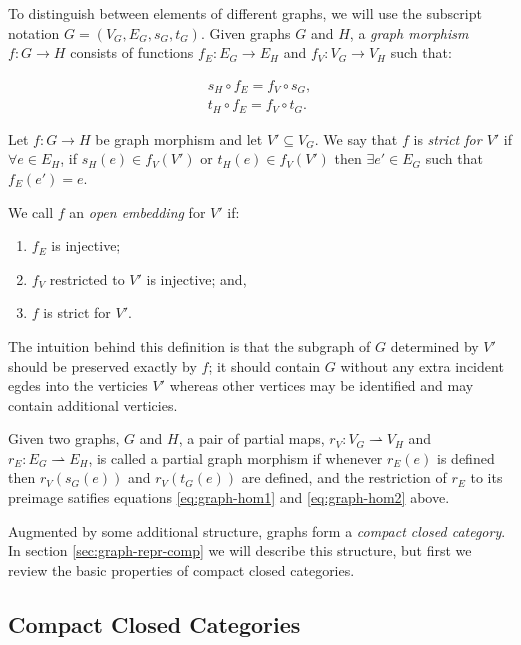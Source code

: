 \documentclass[runningheads]{llncs}
\begin{document}
To distinguish between elements of different graphs, we will use the
subscript notation $G = (V_G,E_G,s_G,t_G)$. Given graphs $G$ and $H$,
a \emph{graph morphism} $f : G\to H$ consists of functions $f_E : E_G
\to E_H$ and $f_V:V_G\to V_H$ such that:

\begin{gather}
  s_H\circ f_E = f_V \circ s_G,\label{eq:graph-hom1}\\
  t_H\circ f_E = f_V \circ t_G\label{eq:graph-hom2}.
\end{gather}

Let $f: G \to H$ be graph morphism and  let $V' \subseteq V_G$. We say
that $f$ is \emph{strict for $V'$} if $\forall e \in E_H$, if $s_H(e)
\in f_V(V')$ or $t_H(e) \in f_V(V')$ then $\exists e' \in E_G$ such
that $f_E(e') = e$. 

\begin{definition}
\label{open-embedding-def}
We call $f$ an \emph{open embedding} for $V'$ if:
\begin{enumerate}
\item $f_E$ is injective;
\item $f_V$ restricted to $V'$ is injective; and,
\item $f$ is strict for $V'$.
\end{enumerate}
\end{definition}

The intuition behind this definition is that the subgraph of $G$
determined by $V'$ should be preserved exactly by $f$; it should
contain $G$ without any extra incident egdes into the verticies $V'$
whereas other vertices may be identified and may contain additional
verticies.

Given two graphs, $G$ and $H$, a pair of partial maps, $r_V: V_G
\rightharpoonup V_H$ and $r_E: E_G \rightharpoonup E_H$, is called a
partial graph morphism if whenever $r_E(e)$ is defined then
$r_V(s_G(e))$ and $r_V(t_G(e))$ are defined, and the restriction of
$r_E$ to its preimage satifies equations \eqref{eq:graph-hom1} and
\eqref{eq:graph-hom2} above.

Augmented by some additional structure, graphs form a \emph{compact closed
category}.  In section \ref{sec:graph-repr-comp} we will describe this
structure, but first we review the basic properties of compact closed
categories.

\subsection{Compact Closed Categories}
\label{sec:comp-clos-categ}
\end{document}
